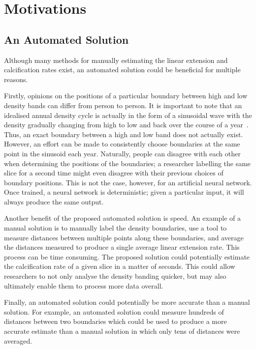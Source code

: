 \section{Motivations}


\subsection{An Automated Solution}

Although many methods for manually estimating the linear extension and calcification rates exist, an automated solution could be beneficial for multiple reasons.

Firstly, opinions on the positions of a particular boundary between high and low density bands can differ from person to person. It is important to note that an idealised annual density cycle is actually in the form of a sinusoidal wave with the density gradually changing from high to low and back over the course of a year~\cite[p. 39]{coralsine}. Thus, an exact boundary between a high and low band does not actually exist. However, an effort can be made to consistently choose boundaries at the same point in the sinusoid each year. Naturally, people can disagree with each other when determining the positions of the boundaries; a researcher labelling the same slice for a second time might even disagree with their previous choices of boundary positions. This is not the case, however, for an artificial neural network. Once trained, a neural network is deterministic; given a particular input, it will always produce the same output.

Another benefit of the proposed automated solution is speed. An example of a manual solution is to manually label the density boundaries, use a tool to measure distances between multiple points along these boundaries, and average the distances measured to produce a single average linear extension rate. This process can be time consuming. The proposed solution could potentially estimate the calcification rate of a given slice in a matter of seconds. This could allow researchers to not only analyse the density banding quicker, but may also ultimately enable them to process more data overall.

Finally, an automated solution could potentially be more accurate than a manual solution. For example, an automated solution could measure hundreds of distances between two boundaries which could be used to produce a more accurate estimate than a manual solution in which only tens of distances were averaged.

